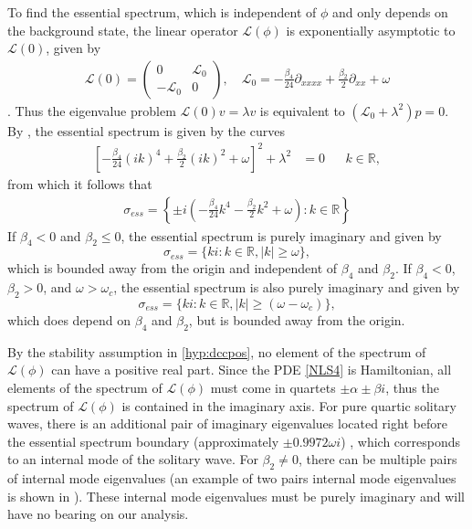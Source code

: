 \documentclass[12pt]{article}
\def\R{{\mathbb R}}
\def\calL{{\mathcal L}}
\begin{document}
To find the essential spectrum, which is independent of $\phi$ and only depends on the background state, the linear operator $\calL(\phi)$ is exponentially asymptotic to $\calL(0)$, given by
\begin{align}\label{defL0}
\calL(0) = 
\begin{pmatrix}
0 & \calL_0 \\
-\calL_0 & 0
\end{pmatrix}, \quad
\calL_0 = -\frac{\beta_4}{24} \partial_{xxxx} + \frac{\beta_2}{2} \partial_{xx} + \omega
\end{align}.
Thus the eigenvalue problem $\calL(0) v = \lambda v$ is equivalent to $(\calL_0 + \lambda^2)p = 0$. By \cite[Theorem 3.1.13]{Kapitula2013}, the essential spectrum is given by the curves
\begin{align*}
\left[ -\frac{\beta_4}{24} (ik)^4 + \frac{\beta_2}{2}(ik)^2 + \omega \right]^2 + \lambda^2 &= 0 && k \in \R,
\end{align*}
from which it follows that
\begin{align*}
\sigma_{ess} = \left\{ \pm i \left( -\frac{\beta_4}{24}k^4 - \frac{\beta_2}{2}k^2 + \omega \right) : k \in \R \right\}
\end{align*}
If $\beta_4 < 0$ and $\beta_2 \leq 0$, the essential spectrum is purely imaginary and given by 
\begin{equation}\label{PQSessspec}
\sigma_{ess} = \{ k i : k \in \R, |k| \geq \omega \},
\end{equation}
which is bounded away from the origin and independent of $\beta_4$ and $\beta_2$. If $\beta_4 < 0$, $\beta_2 > 0$, and $\omega > \omega_c$, the essential spectrum is also purely imaginary and given by 
\begin{equation}\label{essspec2}
\sigma_{ess} = \{ k i : k \in \R, |k| \geq (\omega - \omega_c) \},
\end{equation}
which does depend on $\beta_4$ and $\beta_2$, but is bounded away from the origin.

By the stability assumption in \cref{hyp:dccpos}, no element of the spectrum of $\calL(\phi)$ can have a positive real part. Since the PDE \cref{NLS4} is Hamiltonian, all elements of the spectrum of $\calL(\phi)$ must come in quartets $\pm \alpha \pm \beta i$, thus the spectrum of $\calL(\phi)$ is contained in the imaginary axis. For pure quartic solitary waves, there is an additional pair of imaginary eigenvalues located right before the essential spectrum boundary (approximately $\pm 0.9972 \omega i$) \cite{Tam2019}, which corresponds to an internal mode of the solitary wave. For $\beta_2 \neq 0$, there can be multiple pairs of internal mode eigenvalues (an example of two pairs internal mode eigenvalues is shown in \cite[Figure 9]{Tam2020}). These internal mode eigenvalues must be purely imaginary and will have no bearing on our analysis.
\end{document}
